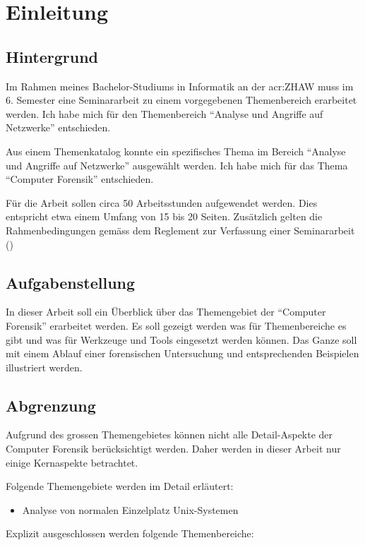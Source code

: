 
\chapter{Einleitung}


\section{Hintergrund}
Im Rahmen meines Bachelor-Studiums in Informatik an der \gls{acr:ZHAW} muss im 6. Semester eine Seminararbeit zu einem vorgegebenen Themenbereich erarbeitet werden. Ich habe mich für den Themenbereich "`Analyse und Angriffe auf Netzwerke"' entschieden.

Aus einem Themenkatalog konnte ein spezifisches Thema im Bereich "`Analyse und Angriffe auf Netzwerke"' ausgewählt werden. Ich habe mich für das Thema "`Computer Forensik"' entschieden.

Für die Arbeit sollen circa 50 Arbeitsstunden aufgewendet werden. Dies entspricht etwa einem Umfang von 15 bis 20 Seiten. Zusätzlich gelten die Rahmenbedingungen gemäss dem Reglement zur Verfassung einer Seminararbeit (\cite{ZHAW:2012:Seminararbeit:Reglemente})

\section{Aufgabenstellung}
In dieser Arbeit soll ein Überblick über das Themengebiet der "`Computer Forensik"' erarbeitet werden. Es soll gezeigt werden was für Themenbereiche es gibt und was für Werkzeuge und Tools eingesetzt werden können. Das Ganze soll mit einem Ablauf einer forensischen Untersuchung und entsprechenden Beispielen illustriert werden.

\section{Abgrenzung}
Aufgrund des grossen Themengebietes können nicht alle Detail-Aspekte der Computer Forensik berücksichtigt werden. Daher werden in dieser Arbeit nur einige Kernaspekte betrachtet. 

Folgende Themengebiete werden im Detail erläutert:
\begin{itemize}
\item Analyse von normalen Einzelplatz Unix-Systemen
\end{itemize}

Explizit ausgeschlossen werden folgende Themenbereiche:

